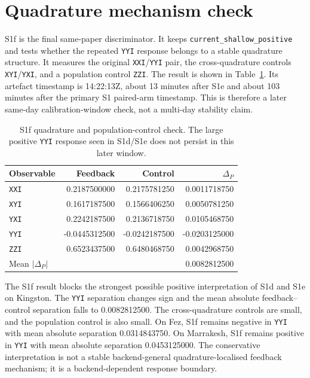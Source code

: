 \documentclass[preprint,aps,physrev,superscriptaddress,floatfix,longbibliography]{revtex4-2}
\begin{document}
\section{Quadrature mechanism check}

S1f is the final same-paper discriminator. It keeps
\texttt{current\_shallow\_positive} and tests whether the repeated
\texttt{YYI} response belongs to a stable quadrature structure. It measures
the original \texttt{XXI}/\texttt{YYI} pair, the cross-quadrature controls
\texttt{XYI}/\texttt{YXI}, and a population control \texttt{ZZI}. The result
is shown in Table~\ref{tab:s1f}. Its artefact timestamp is 14:22:13Z, about
13 minutes after S1e and about 103 minutes after the primary S1 paired-arm
timestamp. This is therefore a later same-day calibration-window check, not a
multi-day stability claim.

\begin{table}[tb]
\centering
\begin{tabular}{lrrr}
\toprule
Observable & Feedback & Control & $\Delta_P$ \\
\midrule
\texttt{XXI} & 0.2187500000 & 0.2175781250 & 0.0011718750 \\
\texttt{XYI} & 0.1617187500 & 0.1566406250 & 0.0050781250 \\
\texttt{YXI} & 0.2242187500 & 0.2136718750 & 0.0105468750 \\
\texttt{YYI} & -0.0445312500 & -0.0242187500 & -0.0203125000 \\
\texttt{ZZI} & 0.6523437500 & 0.6480468750 & 0.0042968750 \\
\midrule
Mean $|\Delta_P|$ & \multicolumn{2}{r}{ } & 0.0082812500 \\
\bottomrule
\end{tabular}
\caption{S1f quadrature and population-control check. The large positive
\texttt{YYI} response seen in S1d/S1e does not persist in this later window.}
\label{tab:s1f}
\end{table}

The S1f result blocks the strongest possible positive interpretation of S1d
and S1e on Kingston. The \texttt{YYI} separation changes sign and the mean
absolute feedback--control separation falls to 0.0082812500. The
cross-quadrature controls are small, and the population control is also small.
On Fez, S1f remains negative in \texttt{YYI} with mean absolute separation
0.0314843750. On Marrakesh, S1f remains positive in \texttt{YYI} with mean
absolute separation 0.0453125000. The conservative interpretation is not a
stable backend-general quadrature-localised feedback mechanism; it is a
backend-dependent response boundary.
\end{document}
